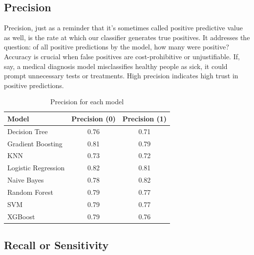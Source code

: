 \subsection{Precision}
Precision, just as a reminder that it’s sometimes called positive predictive value as well, is the rate at which our classifier generates true positives. It addresses the question: of all positive predictions by the model, how many were positive? Accuracy is crucial when false positives are cost-prohibitive or unjustifiable. If, say, a medical diagnosis model misclassifies healthy people as sick, it could prompt unnecessary tests or treatments. High precision indicates high trust in positive predictions.
\begin{table}[H]
\centering
\begin{tabular}{|l|c|c|}
\hline
\textbf{Model} & \textbf{Precision (0)} & \textbf{Precision (1)} \\
\hline
Decision Tree       & 0.76 & 0.71 \\\hline
Gradient Boosting   & 0.81 & 0.79 \\\hline
KNN                 & 0.73 & 0.72 \\\hline
Logistic Regression & 0.82 & 0.81 \\\hline
Naive Bayes         & 0.78 & 0.82 \\\hline
Random Forest       & 0.79 & 0.77 \\\hline
SVM                 & 0.79 & 0.77 \\\hline
XGBoost             & 0.79 & 0.76 \\
\hline
\end{tabular}
\caption{Precision for each model}
\end{table}





\subsection{Recall or Sensitivity}

